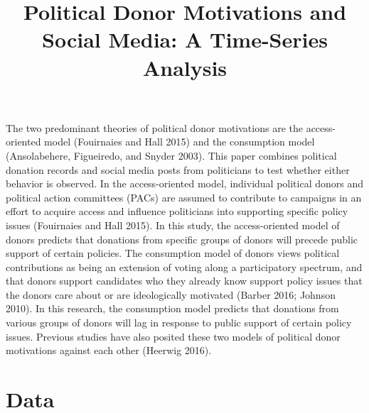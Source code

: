 \documentclass[12pt,]{article}
\title{Political Donor Motivations and Social Media: A Time-Series Analysis  }
\author{\Large \vspace{0.05in} \newline\normalsize\emph{}  }
\date{}
\newcommand*{\authorfont}{\fontfamily{phv}\selectfont}
\begin{document}
	
%

{%
\setlength{\parindent}{0pt}
\thispagestyle{plain}
{\fontsize{18}{20}\selectfont\raggedright 
\maketitle  %

}

{
   \vskip 13.5pt\relax \normalsize\fontsize{11}{12} 
\textbf{\authorfont } \hskip 15pt \emph{\small }   

}

}






\vskip -8.5pt



\noindent \doublespacing 

The two predominant theories of political donor motivations are the
access-oriented model (Fouirnaies and Hall 2015) and the consumption
model (Ansolabehere, Figueiredo, and Snyder 2003). This paper combines
political donation records and social media posts from politicians to
test whether either behavior is observed. In the access-oriented model,
individual political donors and political action committees (PACs) are
assumed to contribute to campaigns in an effort to acquire access and
influence politicians into supporting specific policy issues (Fouirnaies
and Hall 2015). In this study, the access-oriented model of donors
predicts that donations from specific groups of donors will precede
public support of certain policies. The consumption model of donors
views political contributions as being an extension of voting along a
participatory spectrum, and that donors support candidates who they
already know support policy issues that the donors care about or are
ideologically motivated (Barber 2016; Johnson 2010). In this research,
the consumption model predicts that donations from various groups of
donors will lag in response to public support of certain policy issues.
Previous studies have also posited these two models of political donor
motivations against each other (Heerwig 2016).

\hypertarget{data}{%
\section{Data}\label{data}}
\end{document}
